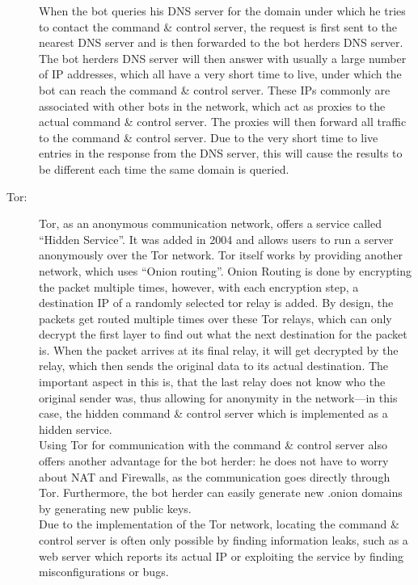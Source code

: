 \documentclass[10pt, a4paper, twocolumn]{article} %
\begin{document}
\begin{description}
When the bot queries his DNS server for the domain under which he tries to contact the command \& control server, the request is first sent to the nearest DNS server and is then forwarded to the bot herders DNS server. The bot herders DNS server will then answer with usually a large number of IP addresses, which all have a very short time to live, under which the bot can reach the command \& control server. These IPs commonly are associated with other bots in the network, which act as proxies to the actual command \& control server. The proxies will then forward all traffic to the command \& control server. Due to the very short time to live entries in the response from the DNS server, this will cause the results to be different each time the same domain is queried. 

\item[Tor:]
Tor, as an anonymous communication network, offers a service called ``Hidden Service''. It was added in 2004 and allows users to run a server anonymously over the Tor network. Tor itself works by providing another network, which uses ``Onion routing''. Onion Routing is done by encrypting the packet multiple times, however, with each encryption step, a destination IP of a randomly selected tor relay is added. By design, the packets get routed multiple times over these Tor relays, which can only decrypt the first layer to find out what the next destination for the packet is. When the packet arrives at its final relay, it will get decrypted by the relay, which then sends the original data to its actual destination. The important aspect in this is, that the last relay does not know who the original sender was, thus allowing for anonymity in the network---in this case, the hidden command \& control server which is implemented as a hidden service.\\
Using Tor for communication with the command \& control server also offers another advantage for the bot herder: he does not have to worry about NAT and Firewalls, as the communication goes directly through Tor. Furthermore, the bot herder can easily generate new .onion domains by generating new public keys\cite{defcon18}. \\
Due to the implementation of the Tor network, locating the command \& control server is often only possible by finding information leaks, such as a web server which reports its actual IP or exploiting the service by finding misconfigurations or bugs.

\end{description}
\end{document}
